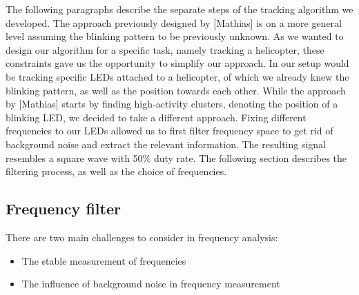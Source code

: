 The following paragraphs describe the separate steps of the tracking algorithm we developed. The approach previously designed by [Mathias] is on a more general level assuming the blinking pattern to be previously unknown. 
As we wanted to design our algorithm for a specific task, namely tracking a helicopter, these constraints gave us the opportunity to simplify our approach. In our setup would be tracking specific LEDs attached to a helicopter, of which we already knew the blinking pattern, as well as the position towards each other. While the approach by [Mathias] starts by finding high-activity clusters, denoting the position of a blinking LED, we decided to take a different approach. Fixing different frequencies to our LEDs allowed us to first filter frequency space to get rid of background noise and extract the relevant information. The resulting signal resembles a square wave with 50\% duty rate. The following section describes the filtering process, as well as the choice of frequencies.


\subsection{Frequency filter}\label{sec:frequencyfilter}

There are two main challenges to consider in frequency analysis:
\begin{itemize}
\item The stable measurement of frequencies
\item The influence of background noise in frequency measurement
\end{itemize}

